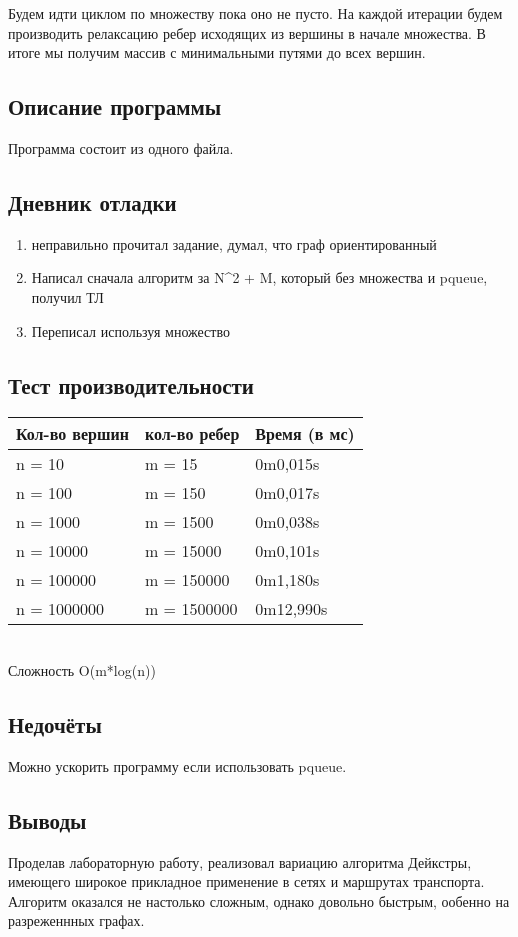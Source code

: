 \documentclass[12pt]{article}
\begin{document}
    Будем идти циклом по множеству пока оно не пусто. На каждой итерации будем производить релаксацию ребер исходящих из вершины в начале множества. В итоге мы получим массив с минимальными путями до всех вершин.
    

    \subsection*{Описание программы}

    Программа состоит из одного файла.

    \subsection*{Дневник отладки}

    \begin{enumerate}
    \item неправильно прочитал задание, думал, что граф ориентированный
    \item Написал сначала алгоритм за N^2 + M, который без множества и pqueue, получил ТЛ
    \item Переписал используя множество
    \end{enumerate}

    \subsection*{Тест производительности}

    \begin{tabular}{ | l | l | l | }
        \hline
            Кол-во вершин & кол-во ребер   & Время (в мс) \\ \hline
            n = 10		&m = 15		& 0m0,015s \\
            n = 100	    &m = 150 	& 0m0,017s  \\
            n = 1000	&m = 1500 	& 0m0,038s \\
            n = 10000	&m = 15000 	& 0m0,101s \\
            n = 100000	&m = 150000 & 0m1,180s  \\
            n = 1000000	&m = 1500000 & 0m12,990s \\
        \hline
    \end{tabular}
 \\
    Сложность O(m*log(n))

    \subsection*{Недочёты}

    Можно ускорить программу если использовать pqueue.

    \subsection*{Выводы}

    Проделав лабораторную работу, реализовал вариацию алгоритма Дейкстры, 
    имеющего широкое прикладное применение в сетях и маршрутах транспорта. Алгоритм оказался не настолько сложным, однако довольно быстрым, ообенно на разреженнных графах.
\end{document}
